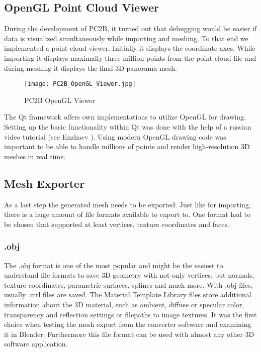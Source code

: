 \subsection{OpenGL Point Cloud Viewer}

During the development of PC2B, it turned out that debugging would be easier if data is visualized simultaneously while importing and meshing. To that end we implemented a point cloud viewer. Initially it displays the coordinate axes. While importing it displays maximally three million points from the point cloud file and during meshing it displays the final 3D panorama mesh.

\begin{figure}[h]
	\centering
	\texttt{[image: PC2B\_OpenGL\_Viewer.jpg]}
	\caption{PC2B OpenGL Viewer}
	\label{fig:pc2b_opengl_viewer}
\end{figure}

The Qt framework offers own implementations to utilize OpenGL for drawing. Setting up the basic functionality within Qt was done with the help of a russian video tutorial (see Enzhaev \parencite{ytQtOpenGL} ). Using modern OpenGL drawing code was important to be able to handle millions of points and render high-resolution 3D meshes in real time.


\subsection{Mesh Exporter}

As a last step the generated mesh needs to be exported. Just like for importing, there is a huge amount of file formats available to export to. One format had to be chosen that supported at least vertices, texture coordinates and faces.

\subsubsection{.obj}

The .obj format is one of the most popular and might be the easiest to understand file formats to save 3D geometry with not only vertices, but normals, texture coordinates, parametric surfaces, splines and much more. With .obj files, usually .mtl files are saved. The Material Template Library files store additional information about the 3D material, such as ambient, diffuse or specular color, transparency and reflection settings or filepaths to image textures. It was the first choice when testing the mesh export from the converter software and examining it in Blender. Furthermore this file format can be used with almost any other 3D software application.


